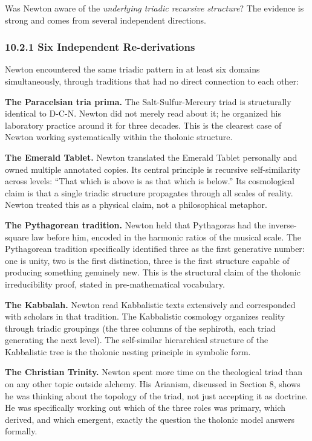 \documentclass[
  11pt,
  letterpaper,
]{article}
\begin{document}
Was Newton aware of the \emph{underlying triadic recursive structure}?
The evidence is strong and comes from several independent directions.

\subsubsection{10.2.1 Six Independent
Re-derivations}\label{six-independent-re-derivations}

Newton encountered the same triadic pattern in at least six domains
simultaneously, through traditions that had no direct connection to each
other:

\textbf{The Paracelsian tria prima.} The Salt-Sulfur-Mercury triad is
structurally identical to D-C-N. Newton did not merely read about it; he
organized his laboratory practice around it for three decades. This is
the clearest case of Newton working systematically within the tholonic
structure.

\textbf{The Emerald Tablet.} Newton translated the Emerald Tablet
personally and owned multiple annotated copies. Its central principle is
recursive self-similarity across levels: ``That which is above is as
that which is below.'' Its cosmological claim is that a single triadic
structure propagates through all scales of reality. Newton treated this
as a physical claim, not a philosophical metaphor.

\textbf{The Pythagorean tradition.} Newton held that Pythagoras had the
inverse-square law before him, encoded in the harmonic ratios of the
musical scale. The Pythagorean tradition specifically identified three
as the first generative number: one is unity, two is the first
distinction, three is the first structure capable of producing something
genuinely new. This is the structural claim of the tholonic
irreducibility proof, stated in pre-mathematical vocabulary.

\textbf{The Kabbalah.} Newton read Kabbalistic texts extensively and
corresponded with scholars in that tradition. The Kabbalistic cosmology
organizes reality through triadic groupings (the three columns of the
sephiroth, each triad generating the next level). The self-similar
hierarchical structure of the Kabbalistic tree is the tholonic nesting
principle in symbolic form.

\textbf{The Christian Trinity.} Newton spent more time on the
theological triad than on any other topic outside alchemy. His Arianism,
discussed in Section 8, shows he was thinking about the topology of the
triad, not just accepting it as doctrine. He was specifically working
out which of the three roles was primary, which derived, and which
emergent, exactly the question the tholonic model answers formally.
\end{document}
